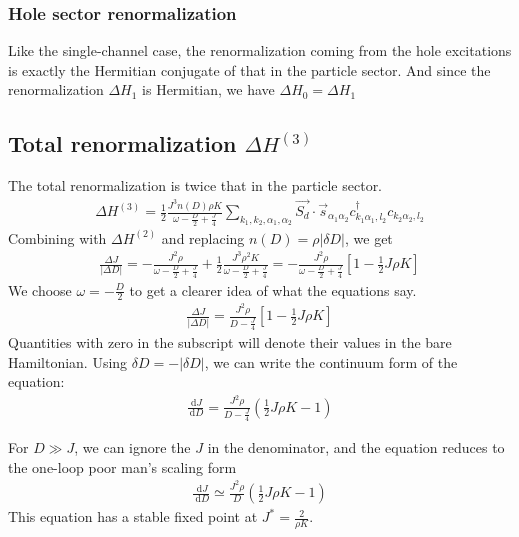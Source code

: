 \documentclass[12pt]{revtex4-2}
\begin{document}
\subsubsection*{\textbf{Hole sector renormalization}}
Like the single-channel case, the renormalization coming from the hole excitations is exactly the Hermitian conjugate of that in the particle sector. And since the renormalization \(\Delta H_1\) is Hermitian, we have \(\Delta H_0 = \Delta H_1\)

\subsection{Total renormalization \(\Delta H^{(3)}\)}
The total renormalization is twice that in the particle sector.
\begin{align}
	\Delta H^{(3)} = \frac{1}{2}\frac{J^3 n(D) \rho K}{\omega - \frac{D}{2} + \frac{J}{4}} \sum_{k_1,k_2,\alpha_1,\alpha_2} \vec{S_d}\cdot\vec{s}_{\alpha_1 \alpha_2} c^\dagger_{k_1\alpha_1,l_2}c_{k_2 \alpha_2,l_2}
\end{align}
Combining with \(\Delta H^{(2)}\) and replacing \(n(D) = \rho |\delta D|\), we get
\begin{align}
	\frac{\Delta J}{|\Delta D|} = -\frac{J^2 \rho}{\omega - \frac{D}{2} + \frac{J}{4}} + \frac{1}{2}\frac{J^3 \rho^2 K}{\omega - \frac{D}{2} + \frac{J}{4}} = -\frac{J^2 \rho}{\omega - \frac{D}{2} + \frac{J}{4}}\left[1 - \frac{1}{2}J\rho K\right] 
\end{align}
We choose \(\omega = -\frac{D}{2}\) to get a clearer idea of what the equations say. 
\begin{align}
	\label{mchannel}
	\frac{\Delta J}{|\Delta D|} = \frac{J^2 \rho}{D - \frac{J}{4}}\left[1 - \frac{1}{2}J\rho K\right] 
\end{align}
Quantities with zero in the subscript will denote their values in the bare Hamiltonian. Using \(\delta D = -|\delta D|\), we can write the continuum form of the equation:
\begin{align}
	\label{rg_beta}
	\frac{\:\mathrm{d}J}{\:\mathrm{d}D} = \frac{J^2 \rho}{D - \frac{J}{4}}\left(\frac{1}{2}J\rho K - 1\right)
\end{align}

For \(D \gg J\), we can ignore the \(J\) in the denominator, and the equation reduces to the one-loop poor man's scaling form
\begin{align}
	\label{pms_mchannel}
	\frac{\:\mathrm{d}J}{\:\mathrm{d}D} \simeq  \frac{J^2 \rho}{D}\left(\frac{1}{2}J\rho K - 1\right)
\end{align}
This equation has a stable fixed point at \(J^* = \frac{2}{\rho K}\).
\end{document}

